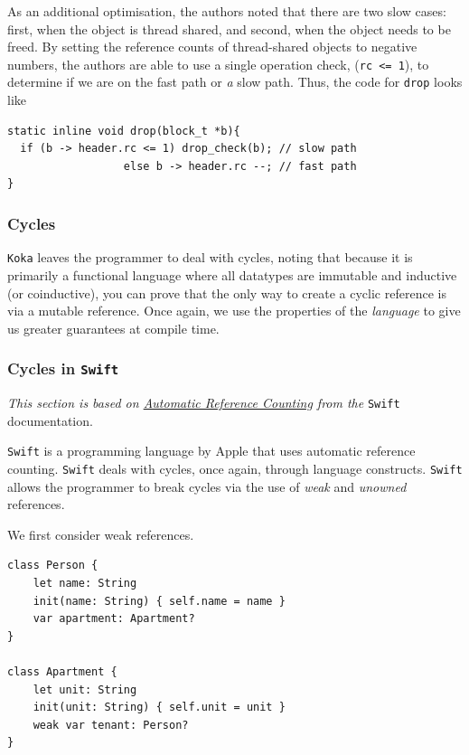 As an additional optimisation, the authors noted that there are two slow cases: first, when the object is thread shared, and second, when the object needs to be freed. By setting the reference counts of thread-shared objects to negative numbers, the authors are able to use a single operation check, (\texttt{rc <= 1}), to determine if we are on the fast path or \textit{a} slow path. Thus, the code for \texttt{drop} looks like

\begin{code}
\label{code:C-negative-rcs}
\begin{verbatim}
static inline void drop(block_t *b){
  if (b -> header.rc <= 1) drop_check(b); // slow path
                  else b -> header.rc --; // fast path
}
\end{verbatim}
\end{code}

\subsubsection{Cycles}
\texttt{Koka} leaves the programmer to deal with cycles, noting that because it is primarily a functional language where all datatypes are immutable and inductive (or coinductive), you can prove that the only way to create a cyclic reference is via a mutable reference. Once again, we use the properties of the \textit{language} to give us greater guarantees at compile time. 

\subsubsection{Cycles in \texttt{Swift}}
\textit{This section is based on \href{https://docs.swift.org/swift-book/documentation/the-swift-programming-language/automaticreferencecounting/}{Automatic Reference Counting} from the} \texttt{Swift} documentation.

\texttt{Swift} is a programming language by Apple that uses automatic reference counting. \texttt{Swift} deals with cycles, once again, through language constructs. \texttt{Swift} allows the programmer to break cycles via the use of \textit{weak} and \textit{unowned} references.

We first consider weak references.

\begin{code}
\label{code:Swift-weak-ref}
\begin{verbatim}
class Person {
    let name: String
    init(name: String) { self.name = name }
    var apartment: Apartment?
}

class Apartment {
    let unit: String
    init(unit: String) { self.unit = unit }
    weak var tenant: Person?
}
\end{verbatim}
\end{code}

